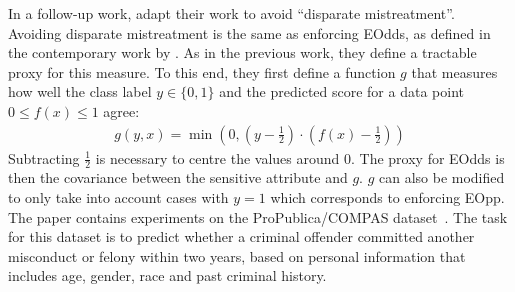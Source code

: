 In a follow-up work, \citet{zafar2017fairnesstreatment} adapt their work to avoid ``disparate mistreatment''.
Avoiding disparate mistreatment is the same as enforcing \acf{EOdds},
as defined in the contemporary work by \citet{hardt2016equality}.
As in the previous work, they define a tractable proxy for this measure.
To this end, they first define a function \(g\) that measures
how well the class label \(y \in \{0, 1\}\) and the predicted score for a data point \(0 \leq f(x) \leq 1\) agree:
\begin{align}
  \label{eq:zafar-constraint-2}
  g(y, x) = \min \left(0, \left(y - \tfrac{1}{2}\right) \cdot \left(f(x) - \tfrac{1}{2}\right)\right)
\end{align}
Subtracting \(\tfrac{1}{2}\) is necessary to centre the values around \(0\).
The proxy for \ac{EOdds} is then the covariance between the sensitive attribute and \(g\).
\(g\) can also be modified to only take into account cases with \(y=1\) which corresponds to enforcing \acf{EOpp}.
The paper contains experiments on the ProPublica/COMPAS dataset~\citep{angwin2016machine}.
The task for this dataset is to predict
whether a criminal offender committed another misconduct or felony within two years,
based on personal information that includes age, gender, race and past criminal history.

